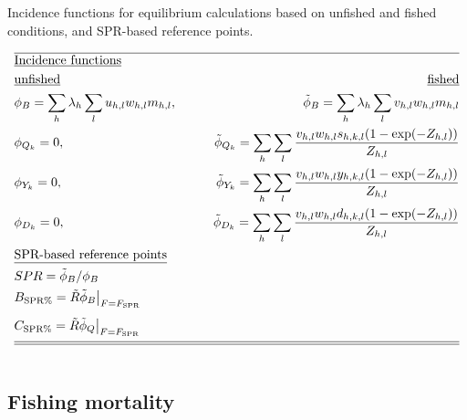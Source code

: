 \documentclass[12pt,letterpaper]{article}
\newcounter{saveEq}
\def\putEq{\setcounter{saveEq}{\value{equation}}}
\def\getEq{\setcounter{equation}{\value{saveEq}}}
\def\tableEq{ %
    \putEq \setcounter{equation}{0}
    \renewcommand{\theequation}{T\arabic{table}.\arabic{equation}}
    \vspace{-5mm}
    }
\def\normalEq{ %
    \getEq
    \renewcommand{\theequation}{\arabic{section}.\arabic{equation}}}
\begin{document}
    \begin{table}
      \centering
      \caption{Incidence functions for equilibrium calculations based on unfished and fished conditions, and SPR-based reference points.}
      \label{tab:incidence_fucntions}
      \tableEq
      \begin{align}
      \hline \nonumber
      &\mbox{\underline{Incidence functions}} \nonumber \\
      &\mbox{\underline{unfished}} &\mbox{\underline{fished}}\nonumber \\
      &\phi_B = \sum_h \lambda_h \sum_l u_{h,l} w_{h,l} m_{h,l}, \qquad
      &\tilde{\phi}_B = \sum_h \lambda_h \sum_l v_{h,l} w_{h,l} m_{h,l}  \label{T3.1}\\
      &\phi_{Q_k} = 0, \qquad
      &\tilde{\phi}_{Q_k} = \sum_h  \sum_l \frac{v_{h,l}  w_{h,l} s_{h,k,l} (1-\exp(-Z_{h,l}))}{Z_{h,l}} \\
      &\phi_{Y_k} = 0, \qquad
      &\tilde{\phi}_{Y_k} = \sum_h  \sum_l \frac{v_{h,l}  w_{h,l} y_{h,k,l} (1-\exp(-Z_{h,l}))}{Z_{h,l}} \\
      &\phi_{D_k} = 0, \qquad
      &\tilde{\phi}_{D_k} = \sum_h  \sum_l \frac{v_{h,l}  w_{h,l} d_{h,k,l} (1-\exp(-Z_{h,l}))}{Z_{h,l}} \\
      &\mbox{\underline{SPR-based reference points}} \nonumber \\
      & SPR = \tilde{\phi}_B/ \phi_B \label{T2.3}\\
      & B_{\textnormal{SPR\%}} = \tilde{R} \tilde{\phi}_B \bigr\rvert _{F=F_{\textnormal{SPR}}} \label{T2.4}\\[1ex]
      & C_{\textnormal{SPR\%}} = \tilde{R} \tilde{\phi}_Q \bigr\rvert _{F=F_{\textnormal{SPR}}} \label{T2.5}\\[1ex]
      \hline \hline \nonumber
      \end{align}
      \normalEq
    \end{table}


    \subsection*{Fishing mortality} %
    \label{sub:fishing_mortality}
\end{document}
